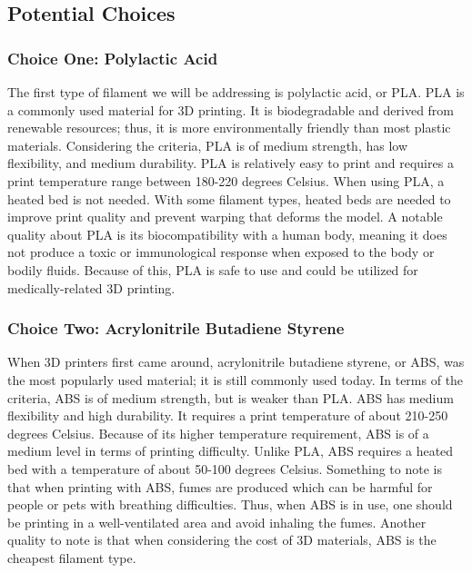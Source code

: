 \documentclass[letterpaper, onecolumn, draftclsnofoot,10pt, compsoc]{IEEEtran}
\begin{document}
\begin{singlespace}
\subsection{Potential Choices}
\subsubsection{Choice One: Polylactic Acid}
The first type of filament we will be addressing is polylactic acid, or PLA. 
PLA is a commonly used material for 3D printing. 
It is biodegradable and derived from renewable resources; thus, it is more environmentally friendly than most plastic materials. 
Considering the criteria, PLA is of medium strength, has low flexibility, and medium durability. 
PLA is relatively easy to print and requires a print temperature range between 180-220 degrees Celsius.  
When using PLA, a heated bed is not needed. 
With some filament types, heated beds are needed to improve print quality and prevent warping that deforms the model.\cite{heatbedweb}
A notable quality about PLA is its biocompatibility with a human body, meaning it does not produce a toxic or immunological response when exposed to the body or bodily fluids.
Because of this, PLA is safe to use and could be utilized for medically-related 3D printing. \cite{filamentweb}
\subsubsection{Choice Two: Acrylonitrile Butadiene Styrene}
When 3D printers first came around, acrylonitrile butadiene styrene, or ABS, was the most popularly used material; it is still commonly used today. 
In terms of the criteria, ABS is of medium strength, but is weaker than PLA.
ABS has medium flexibility and high durability.
It requires a print temperature of about 210-250 degrees Celsius.
Because of its higher temperature requirement, ABS is of a medium level in terms of printing difficulty. 
Unlike PLA, ABS requires a heated bed with a temperature of about 50-100 degrees Celsius.
Something to note is that when printing with ABS, fumes are produced which can be harmful for people or pets with breathing difficulties.
Thus, when ABS is in use, one should be printing in a well-ventilated area and avoid inhaling the fumes. 
Another quality to note is that when considering the cost of 3D materials, ABS is the cheapest filament type. \cite{filamentweb}

\end{singlespace}
\end{document}
